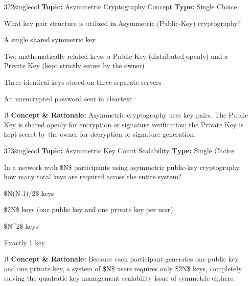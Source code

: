 \begin{qcard}{322}{singlecol}
\textcolor{darkslate!75}{\small\textbf{Topic:} Asymmetric Cryptography Concept \hfill \textbf{Type:} Single Choice}\vspace{0.4em}\par
What key pair structure is utilized in Asymmetric (Public-Key) cryptography?
\begin{qoptions}
\item A single shared symmetric key
\item Two mathematically related keys: a Public Key (distributed openly) and a Private Key (kept strictly secret by the owner)
\item Three identical keys stored on three separate servers
\item An unencrypted password sent in cleartext
\end{qoptions}
\end{qcard}
\nopagebreak
\begin{explainbox}{B}
\textbf{Concept \& Rationale:} Asymmetric cryptography uses key pairs. The Public Key is shared openly for encryption or signature verification; the Private Key is kept secret by the owner for decryption or signature generation.
\end{explainbox}

\begin{qcard}{323}{singlecol}
\textcolor{darkslate!75}{\small\textbf{Topic:} Asymmetric Key Count Scalability \hfill \textbf{Type:} Single Choice}\vspace{0.4em}\par
In a network with \$N\$ participants using asymmetric public-key cryptography, how many total keys are required across the entire system?
\begin{qoptions}
\item \$N(N-1)/2\$ keys
\item \$2N\$ keys (one public key and one private key per user)
\item \$N\textasciicircum{}2\$ keys
\item Exactly 1 key
\end{qoptions}
\end{qcard}
\nopagebreak
\begin{explainbox}{B}
\textbf{Concept \& Rationale:} Because each participant generates one public key and one private key, a system of \$N\$ users requires only \$2N\$ keys, completely solving the quadratic key-management scalability issue of symmetric ciphers.
\end{explainbox}

